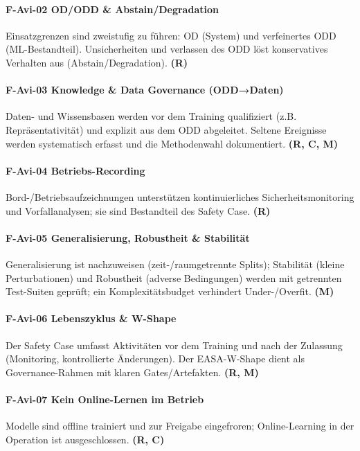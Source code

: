 \paragraph {F-Avi-02 OD/ODD \& Abstain/Degradation}
  {Einsatzgrenzen sind zweistufig zu führen: OD (System) und verfeinertes ODD (ML-Bestandteil). 
  Unsicherheiten und verlassen des ODD löst konservatives Verhalten aus (Abstain/Degradation). 
   \textbf{(R)}}

\paragraph {F-Avi-03 Knowledge \& Data Governance (ODD→Daten)}
  {Daten- und Wissensbasen werden vor dem Training qualifiziert (z.B. Repräsentativität) 
  und explizit aus dem ODD abgeleitet. Seltene Ereignisse werden systematisch erfasst und die Methodenwahl dokumentiert. 
  \textbf{(R, C, M)}}

\paragraph {F-Avi-04 Betriebs-Recording}
  {Bord-/Betriebsaufzeichnungen unterstützen kontinuierliches Sicherheitsmonitoring und Vorfallanalysen; 
  sie sind Bestandteil des Safety Case. 
  \textbf{(R)}}

\paragraph {F-Avi-05 Generalisierung, Robustheit \& Stabilität}
  {Generalisierung ist nachzuweisen (zeit-/raumgetrennte Splits); Stabilität (kleine Perturbationen) 
  und Robustheit (adverse Bedingungen) werden mit getrennten Test-Suiten geprüft; ein Komplexitätsbudget 
  verhindert Under-/Overfit. 
   \textbf{(M)}}

\paragraph {F-Avi-06 Lebenszyklus \& W-Shape}
  {Der Safety Case umfasst Aktivitäten vor dem Training und nach der Zulassung 
  (Monitoring, kontrollierte Änderungen). Der EASA-W-Shape dient als Governance-Rahmen mit klaren Gates/Artefakten. 
  \textbf{(R, M)}}

\paragraph {F-Avi-07 Kein Online-Lernen im Betrieb}
  {Modelle sind offline trainiert und zur Freigabe eingefroren; Online-Learning in der 
  Operation ist ausgeschlossen. 
  \textbf{(R, C)}}

